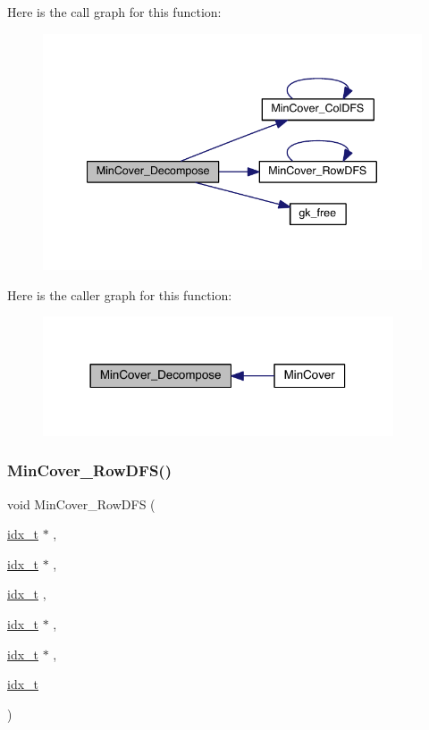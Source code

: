 Here is the call graph for this function\+:\nopagebreak
\begin{figure}[H]
\begin{center}
\leavevmode
\includegraphics[width=340pt]{a00945_adafb285aeb4295e7bbdddef0499e209c_cgraph}
\end{center}
\end{figure}
Here is the caller graph for this function\+:\nopagebreak
\begin{figure}[H]
\begin{center}
\leavevmode
\includegraphics[width=294pt]{a00945_adafb285aeb4295e7bbdddef0499e209c_icgraph}
\end{center}
\end{figure}
\mbox{\label{a00945_a0c77f3519b6c0379ff1129d2db5af605}} 
\subsubsection{\texorpdfstring{Min\+Cover\+\_\+\+Row\+D\+F\+S()}{MinCover\_RowDFS()}}
{\footnotesize\ttfamily void Min\+Cover\+\_\+\+Row\+D\+FS (\begin{DoxyParamCaption}\item[{\hyperlink{a00876_aaa5262be3e700770163401acb0150f52}{idx\+\_\+t} $\ast$}]{,  }\item[{\hyperlink{a00876_aaa5262be3e700770163401acb0150f52}{idx\+\_\+t} $\ast$}]{,  }\item[{\hyperlink{a00876_aaa5262be3e700770163401acb0150f52}{idx\+\_\+t}}]{,  }\item[{\hyperlink{a00876_aaa5262be3e700770163401acb0150f52}{idx\+\_\+t} $\ast$}]{,  }\item[{\hyperlink{a00876_aaa5262be3e700770163401acb0150f52}{idx\+\_\+t} $\ast$}]{,  }\item[{\hyperlink{a00876_aaa5262be3e700770163401acb0150f52}{idx\+\_\+t}}]{ }\end{DoxyParamCaption})}

